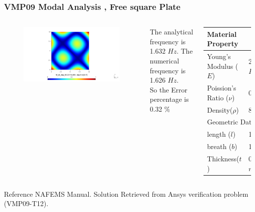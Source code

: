 \documentclass[9pt]{beamer}
\begin{document}
\begin{frame}
\frametitle{VMP09 Modal Analysis , Free square Plate}

\begin{columns}

\begin{figure}[h!]
\centering
{}%
  \includegraphics[width=\linewidth,trim={8cm 4cm 8cm 2cm},clip]{VMP09_T12_pos_F9.png}
\endminipage
\end{figure}

The analytical frequency is 1.632 $Hz$. 
The numerical frequency is  1.626 $Hz$. \\
So the Error percentage is  0.32 $\%$ 



\begin{table}[ht]
\renewcommand{\arraystretch}{1.5}
\centering
\begin{tabular}{ll}
\hline
\multicolumn{2}{l}{Material Property} \\ \hline  \hline
Young's Modulus ($E$)          &25E11 $Pa$        \\
Poission's Ratio ($\nu$)       & 0.3            \\ 
Density($\rho$)       &     8000         \\ 
    \hline
    \multicolumn{2}{l}{Geometric Data} \\ \hline  \hline
            length ($l$)        & 10 $m$   \\
            breath ($b$)        & 10 $m$   \\
            Thickness($t$)     &         0.01 $m$  \\
             \hline
\end{tabular}
\end{table}

\end{columns}



\begin{block}{Reference}
NAFEMS Manual. Solution Retrieved from Ansys verification problem (VMP09-T12).
\end{block}

\end{frame}
\end{document}
